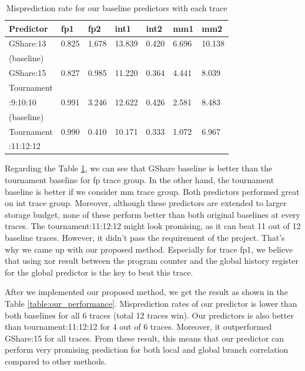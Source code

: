 \documentclass[conference]{IEEEtran}
\begin{document}
\begin{scriptsize}
\begin{table}[h!]
  \centering
  \caption{Misprediction rate for our baseline predictors with each trace}
  \label{table:baseline_performance}
  \begin{tabular}{|l|l|l|l|l|l|l|}
    \hline
    \textbf{Predictor} & \textbf{fp1} & \textbf{fp2} & \textbf{int1} &\textbf{int2} & \textbf{mm1} & \textbf{mm2}\\
    \hline
    \hline
    GShare:13 & 0.825 & 1.678 & 13.839 & 0.420 & 6.696 & 10.138 \\
    (baseline) & & & & & & \\
    \hline
    GShare:15 & 0.827 & 0.985 & 11.220 & 0.364 & 4.441 & 8.039 \\
    \hline
    Tournament & & & & & & \\
    :9:10:10 & 0.991 & 3.246 & 12.622 & 0.426 & 2.581 & 8.483 \\
    (baseline) & & & & & & \\
    \hline
    Tournament & 0.990 & 0.410 & 10.171 & 0.333 & 1.072 & 6.967 \\
    :11:12:12 & & & & & & \\
    \hline
  \end{tabular}
\end{table}
\end{scriptsize}

Regarding the Table \ref{table:baseline_performance}, we can see that GShare baseline is better than
the tournament baseline for fp trace group. In the other hand, the tournament
baseline is better if we consider mm trace group. Both predictors performed
great on int trace group. Moreover, although these predictors are extended
to larger storage budget, none of these perform better than both original baselines
at every traces. The tournament:11:12:12 might look promising, as it can beat 11 out of 12
baseline traces. However, it didn't pass the requirement of the project. That's why we came up
with our proposed method. Especially for trace fp1, we believe that using xor result
between the program counter and the global history register for the global predictor
is the key to beat this trace.

After we implemented our proposed method, we get the result as shown in the Table \ref{table:our_performance}.
Misprediction rates of our predictor is lower than both baselines for all 6 traces (total 12 traces win).
Our predictors is also better than tournament:11:12:12 for 4 out of 6 traces. Moreover,
it outperformed GShare:15 for all traces. From these result, this means that our predictor
can perform very promising prediction for both local and global branch correlation compared
to other methods.
\end{document}
